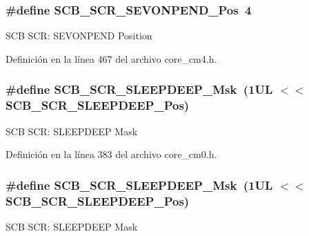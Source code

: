 \subsubsection[{\texorpdfstring{S\+C\+B\+\_\+\+S\+C\+R\+\_\+\+S\+E\+V\+O\+N\+P\+E\+N\+D\+\_\+\+Pos}{SCB_SCR_SEVONPEND_Pos}}]{\setlength{\rightskip}{0pt plus 5cm}\#define S\+C\+B\+\_\+\+S\+C\+R\+\_\+\+S\+E\+V\+O\+N\+P\+E\+N\+D\+\_\+\+Pos~4}\hypertarget{group___c_m_s_i_s___s_c_b_ga3bddcec40aeaf3d3a998446100fa0e44}{}\label{group___c_m_s_i_s___s_c_b_ga3bddcec40aeaf3d3a998446100fa0e44}
S\+CB S\+CR\+: S\+E\+V\+O\+N\+P\+E\+ND Position 

Definición en la línea 467 del archivo core\+\_\+cm4.\+h.

\subsubsection[{\texorpdfstring{S\+C\+B\+\_\+\+S\+C\+R\+\_\+\+S\+L\+E\+E\+P\+D\+E\+E\+P\+\_\+\+Msk}{SCB_SCR_SLEEPDEEP_Msk}}]{\setlength{\rightskip}{0pt plus 5cm}\#define S\+C\+B\+\_\+\+S\+C\+R\+\_\+\+S\+L\+E\+E\+P\+D\+E\+E\+P\+\_\+\+Msk~(1\+U\+L $<$$<$ S\+C\+B\+\_\+\+S\+C\+R\+\_\+\+S\+L\+E\+E\+P\+D\+E\+E\+P\+\_\+\+Pos)}\hypertarget{group___c_m_s_i_s___s_c_b_ga77c06a69c63f4b3f6ec1032e911e18e7}{}\label{group___c_m_s_i_s___s_c_b_ga77c06a69c63f4b3f6ec1032e911e18e7}
S\+CB S\+CR\+: S\+L\+E\+E\+P\+D\+E\+EP Mask 

Definición en la línea 383 del archivo core\+\_\+cm0.\+h.

\subsubsection[{\texorpdfstring{S\+C\+B\+\_\+\+S\+C\+R\+\_\+\+S\+L\+E\+E\+P\+D\+E\+E\+P\+\_\+\+Msk}{SCB_SCR_SLEEPDEEP_Msk}}]{\setlength{\rightskip}{0pt plus 5cm}\#define S\+C\+B\+\_\+\+S\+C\+R\+\_\+\+S\+L\+E\+E\+P\+D\+E\+E\+P\+\_\+\+Msk~(1\+U\+L $<$$<$ S\+C\+B\+\_\+\+S\+C\+R\+\_\+\+S\+L\+E\+E\+P\+D\+E\+E\+P\+\_\+\+Pos)}\hypertarget{group___c_m_s_i_s___s_c_b_ga77c06a69c63f4b3f6ec1032e911e18e7}{}\label{group___c_m_s_i_s___s_c_b_ga77c06a69c63f4b3f6ec1032e911e18e7}
S\+CB S\+CR\+: S\+L\+E\+E\+P\+D\+E\+EP Mask 

